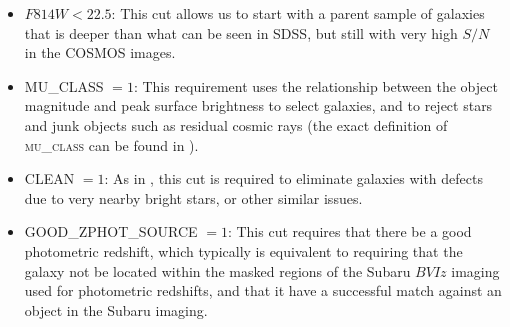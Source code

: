 \documentclass[twocolumn,useAMS,usenatbib]{mn2e}
\newcommand{\newtext}{}
\begin{document}
\begin{itemize}
\item $F814W< 22.5$: This cut allows us to start with a parent sample of
galaxies that is deeper than what can be seen in SDSS, but still with
very high $S/N$ in the COSMOS images.  
\item MU\_CLASS $=1$: This requirement \newtext{uses the relationship
    between the object magnitude and peak surface brightness} to select
  galaxies, and to reject stars \newtext{and junk objects such as
    residual cosmic rays} (the exact definition of \textsc{mu\_class} can be found in
  \citealt{2007ApJS..172..219L}).  
\item CLEAN $=1$: As in \citet{2007ApJS..172..219L}, this cut
  is required to eliminate galaxies with defects due to very nearby bright stars, or other similar issues.
\item GOOD\_ZPHOT\_SOURCE $=1$: This cut requires that there
  be a good photometric redshift, which typically is equivalent to
  requiring that the galaxy not be located within the masked regions
  of the Subaru $BVIz$ imaging used for photometric redshifts, and that it have a successful match against an
  object in the Subaru imaging.%
\end{itemize}
\end{document}
